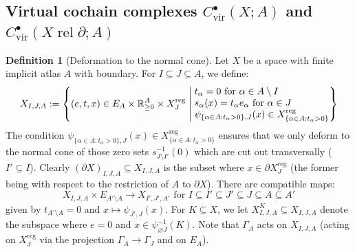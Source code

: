 \documentclass[12pt]{article}
\theoremstyle{definition}
\newtheorem{definition}[theorem]{Definition}
\theoremstyle{remark}
\numberwithin{equation}{subsection}
\newcommand{\RR}{\mathbb R}
\newcommand{\vir}{\mathrm{vir}}
\newcommand{\reg}{\mathrm{reg}}
\newcommand{\rel}{\operatorname{rel}}
\begin{document}
\subsection{Virtual cochain complexes \texorpdfstring{$C^\bullet_\vir(X;A)$}{C\_vir(X;A)} and \texorpdfstring{$C^\bullet_\vir(X\rel\partial;A)$}{C\_vir(X rel d;A)}}\label{Fsheafdefsec}

\begin{definition}[Deformation to the normal cone]
Let $X$ be a space with finite implicit atlas $A$ with boundary.  For $I\subseteq J\subseteq A$, we define:
\begin{equation*}%
X_{I,J,A}:=\left\{(e,t,x)\in E_A\times\RR_{\geq 0}^A\times X_J^\reg\;\middle|\;\begin{matrix}t_\alpha=0\text{ for }\alpha\in A\setminus I\hfill\cr s_\alpha(x)=t_\alpha e_\alpha\text{ for }\alpha\in J\hfill\cr\psi_{\{\alpha\in A:t_\alpha>0\},J}(x)\in X_{\{\alpha\in A:t_\alpha>0\}}^\reg\hfill\end{matrix}\right\}
\end{equation*}
The condition $\psi_{\{\alpha\in A:t_\alpha>0\},J}(x)\in X_{\{\alpha\in A:t_\alpha>0\}}^\reg$ ensures that we only deform to the normal cone of those zero sets $s_{J\setminus I'}^{-1}(0)$ which are cut out transversally ($I'\subseteq I$).  Clearly $(\partial X)_{I,J,A}\subseteq X_{I,J,A}$ is the subset where $x\in\partial X_J^\reg$ (the former being with respect to the restriction of $A$ to $\partial X$).  There are compatible maps:
\begin{equation}\label{pushforward}
X_{I,J,A}\times E_{A'\setminus A}\to X_{I',J',A'}\text{ for }I\subseteq I'\subseteq J'\subseteq J\subseteq A\subseteq A'
\end{equation}
given by $t_{A'\setminus A}=0$ and $x\mapsto\psi_{J',J}(x)$.  For $K\subseteq X$, we let $X_{I,J,A}^K\subseteq X_{I,J,A}$ denote the subspace where $e=0$ and $x\in\psi_{\varnothing J}^{-1}(K)$.  Note that $\Gamma_A$ acts on $X_{I,J,A}$ (acting on $X_J^\reg$ via the projection $\Gamma_A\to\Gamma_J$ and on $E_A$).
\end{definition}
\end{document}
